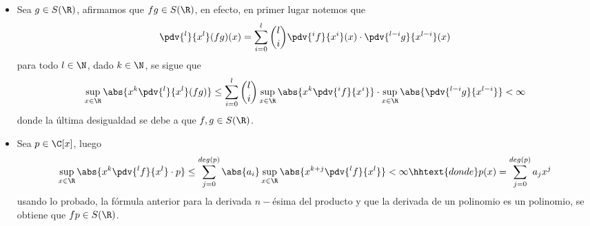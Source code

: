 \documentclass{article}
\begin{document}
\begin{enumerate}
\begin{itemize}
        \item Sea $g\in S(\R)$, afirmamos que $fg\in S(\R)$, en efecto, en 
        primer lugar notemos que
        \begin{equation*}
            \pdv{^{l}}{x^{l}}(fg)(x)
            =\sum_{i=0}^{l}\binom{l}{i}\pdv{^{i}f}{x^{i}}(x)\cdot\pdv{^{l-i}g}{x^{l-i}}(x)
        \end{equation*}
        para todo $l\in\N$, dado $k\in\N$, se sigue que
        \begin{equation*}
            \sup_{x\in\R}\abs{x^{k}\pdv{^{l}}{x^{l}}(fg)}
            \leq\sum_{i=0}^{l}\binom{l}{i}\sup_{x\in\R}\abs{x^{k}\pdv{^{i}f}{x^{i}}}
            \cdot\sup_{x\in\R}\abs{\pdv{^{l-i}g}{x^{l-i}}}<\infty
        \end{equation*}
        donde la última desigualdad se debe a que $f,g\in S(\R)$.

        \item Sea $p\in\C[x]$, luego
        \begin{equation*}
            \sup_{x\in\R}\abs{x^{k}\pdv{^{l}f}{x^{l}}\cdot p}
            \leq\sum_{j=0}^{deg(p)}\abs{a_{i}}\sup_{x\in\R}\abs{x^{k+j}\pdv{^{l}f}{x^{l}}}<\infty
            \hhtext{donde}
            p(x)=\sum_{j=0}^{deg(p)}a_{j}x^{j}
        \end{equation*}
        usando lo probado, la fórmula anterior para la derivada $n-$ésima del producto y que la
        derivada de un polinomio es un polinomio, se obtiene que $fp\in S(\R)$.


\end{itemize}
\end{enumerate}
\end{document}
